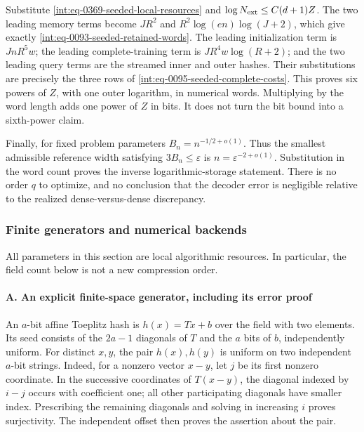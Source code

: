 
Substitute \eqref{int:eq-0369-seeded-local-resources} and \(\log N_{\rm ext}\le C(d+1)Z\). The two leading memory terms become \(JR^2\) and \(R^2\log(en)\log(J+2)\), which give exactly \eqref{int:eq-0093-seeded-retained-words}. The leading initialization term is \(JnR^5w\); the leading complete-training term is \(JR^4w\log(R+2)\); and the two leading query terms are the streamed inner and outer hashes. Their substitutions are precisely the three rows of \eqref{int:eq-0095-seeded-complete-costs}. This proves six powers of \(Z\), with one outer logarithm, in numerical words. Multiplying by the word length adds one power of \(Z\) in bits. It does not turn the bit bound into a sixth-power claim.



Finally, for fixed problem parameters \(B_n=n^{-1/2+o(1)}\). Thus the smallest admissible reference width satisfying \(3B_n\le\varepsilon\) is \(n=\varepsilon^{-2+o(1)}\). Substitution in the word count proves the inverse logarithmic-storage statement. There is no order \(q\) to optimize, and no conclusion that the decoder error is negligible relative to the realized dense-versus-dense discrepancy.


\subsubsection{Finite generators and numerical backends}
\label{int:decoder-finite-backends}


All parameters in this section are local algorithmic resources. In particular, the field count below is not a new compression order.


\paragraph{A. An explicit finite-space generator, including its error proof}

\mbox{}\par\smallskip


An \(a\)-bit affine Toeplitz hash is \(h(x)=Tx+b\) over the field with two elements. Its seed consists of the \(2a-1\) diagonals of \(T\) and the \(a\) bits of \(b\), independently uniform. For distinct \(x,\allowbreak y\), the pair \(h(x),\allowbreak h(y)\) is uniform on two independent \(a\)-bit strings. Indeed, for a nonzero vector \(x-y\), let \(j\) be its first nonzero coordinate. In the successive coordinates of \(T(x-y)\), the diagonal indexed by \(i-j\) occurs with coefficient one; all other participating diagonals have smaller index. Prescribing the remaining diagonals and solving in increasing \(i\) proves surjectivity. The independent offset then proves the assertion about the pair.


